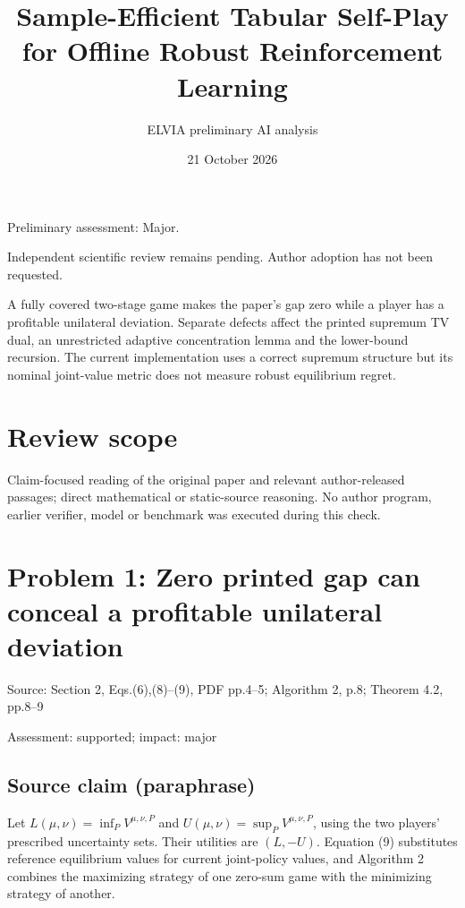 \documentclass[11pt]{article}
\begin{document}
\title{Sample-Efficient Tabular Self-Play for Offline Robust Reinforcement Learning}

\author{ELVIA preliminary AI analysis}\date{21 October 2026}\maketitle

Preliminary assessment: Major.\par

Independent scientific review remains pending. Author adoption has not been requested.

A fully covered two-stage game makes the paper’s gap zero while a player has a profitable unilateral deviation. Separate defects affect the printed supremum TV dual, an unrestricted adaptive concentration lemma and the lower-bound recursion. The current implementation uses a correct supremum structure but its nominal joint-value metric does not measure robust equilibrium regret.

\section*{Review scope}

Claim-focused reading of the original paper and relevant author-released passages; direct mathematical or static-source reasoning. No author program, earlier verifier, model or benchmark was executed during this check.

\section*{Problem 1: Zero printed gap can conceal a profitable unilateral deviation}

Source: Section 2, Eqs.(6),(8)–(9), PDF pp.4–5; Algorithm 2, p.8; Theorem 4.2, pp.8–9

Assessment: supported; impact: major

\subsection*{Source claim (paraphrase)}

Let \(L(\mu,\nu)=\inf_P V^{\mu,\nu,P}\) and \(U(\mu,\nu)=\sup_P V^{\mu,\nu,P}\), using the two players’ prescribed uncertainty sets. Their utilities are \((L,-U)\). Equation (9) substitutes reference equilibrium values for current joint-policy values, and Algorithm 2 combines the maximizing strategy of one zero-sum game with the minimizing strategy of another.
\end{document}
